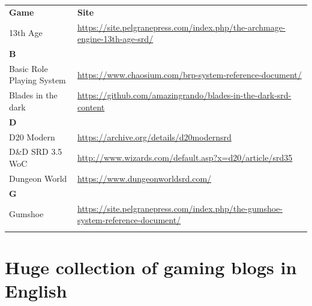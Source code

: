 \documentclass[a4paper, 11pt, twoside]{article}
\begin{document}
\begin{longtable}{lp{10cm}}
\textbf{Game} & \textbf{Site}\\
13th Age & \url{https://site.pelgranepress.com/index.php/the-archmage-engine-13th-age-srd/}\\
\textbf{B} & \\
Basic Role Playing System & \url{https://www.chaosium.com/brp-system-reference-document/}\\
Blades in the dark & \url{https://github.com/amazingrando/blades-in-the-dark-srd-content}\\
\textbf{D} & \\
D20 Modern & \url{https://archive.org/details/d20modernsrd}\\
D\&D SRD 3.5 WoC & \url{http://www.wizards.com/default.asp?x=d20/article/srd35}\\
Dungeon World & \url{https://www.dungeonworldsrd.com/}\\
\textbf{G} & \\
Gumshoe & \url{https://site.pelgranepress.com/index.php/the-gumshoe-system-reference-document/}\\
 & \\
\end{longtable}

\section{Huge collection of gaming blogs in English}
\label{sec:orga975591}
\end{document}
